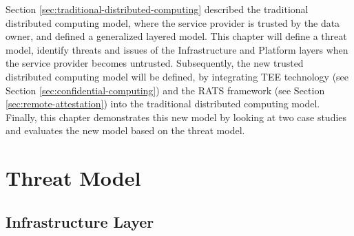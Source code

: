 Section \ref{sec:traditional-distributed-computing} described the traditional
distributed computing model, where the service provider is trusted by the data
owner, and defined a generalized layered model. This chapter will define a
threat model, identify threats and issues of the Infrastructure and Platform
layers when the service provider becomes untrusted. Subsequently, the new
trusted distributed computing model will be defined, by integrating TEE
technology (see Section \ref{sec:confidential-computing}) and the RATS framework
(see Section \ref{sec:remote-attestation}) into the traditional distributed
computing model. Finally, this chapter demonstrates this new model by looking at
two case studies and evaluates the new model based on the threat model.

\section{Threat Model}
\label{sec:untrusted-threat-model}

\subsection{Infrastructure Layer}

